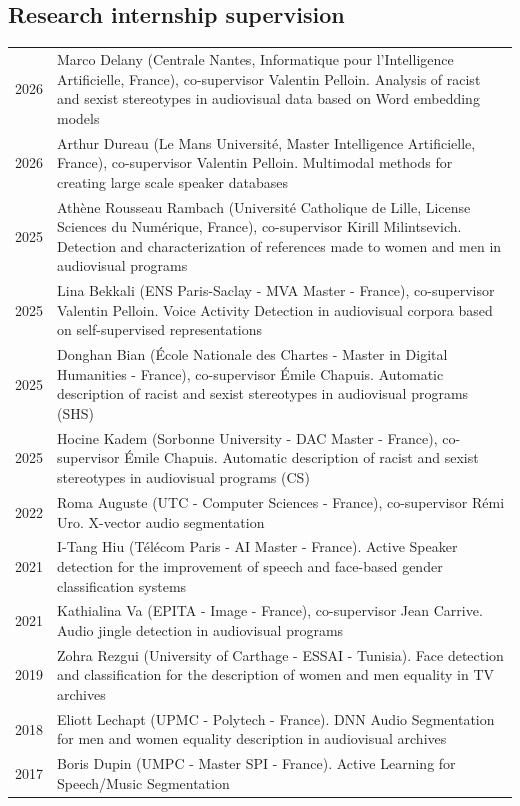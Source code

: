 \begin{en}
\subsection{Research internship supervision}
\begin{tabularx}{\linewidth}{@{}l X@{}}
2026 & Marco Delany (Centrale Nantes, Informatique pour l'Intelligence Artificielle, France), co-supervisor Valentin Pelloin. Analysis of racist and sexist stereotypes in audiovisual data based on Word embedding models\\
2026 & Arthur Dureau (Le Mans Université, Master Intelligence Artificielle, France), co-supervisor Valentin Pelloin. Multimodal methods for creating large scale speaker databases\\
2025 & Athène Rousseau Rambach (Université Catholique de Lille, License Sciences du Numérique, France), co-supervisor Kirill Milintsevich. Detection and characterization of references made to women and men in audiovisual programs\\
2025 & Lina Bekkali (ENS Paris-Saclay - MVA Master - France), co-supervisor Valentin Pelloin. Voice Activity Detection in audiovisual corpora based on self-supervised representations\\
2025 & Donghan Bian (\'Ecole Nationale des Chartes - Master in Digital Humanities - France), co-supervisor \'Emile Chapuis. Automatic description of racist and sexist stereotypes in audiovisual programs (SHS)\\
2025 & Hocine Kadem (Sorbonne University - DAC Master - France), co-supervisor \'Emile Chapuis. Automatic description of racist and sexist stereotypes in audiovisual programs (CS)\\
2022 & Roma Auguste (UTC - Computer Sciences - France), co-supervisor Rémi Uro. X-vector audio segmentation\\
2021 & I-Tang Hiu (Télécom Paris - AI Master - France). Active Speaker detection for the improvement of speech and face-based gender classification systems\\
2021 & Kathialina Va (EPITA - Image - France), co-supervisor Jean Carrive. Audio jingle detection in audiovisual programs\\
2019 & Zohra Rezgui (University of Carthage - ESSAI - Tunisia). Face detection and classification for the description of women and men equality in TV archives\\
2018 & Eliott Lechapt (UPMC - Polytech - France). DNN Audio Segmentation for men and women equality description in audiovisual archives\\
2017 & Boris Dupin (UMPC - Master SPI - France). Active Learning for Speech/Music Segmentation\\
\end{tabularx}
\end{en}


